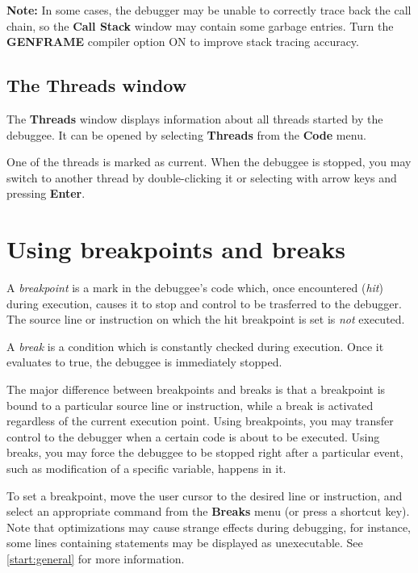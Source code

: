{\bf Note:} In some cases, the debugger may be unable to correctly trace back the
call chain, so the {\bf Call Stack} window may contain some garbage entries.
Turn the {\bf GENFRAME} compiler option ON to improve stack tracing accuracy.

\subsection{The Threads window}
\label{dialog:executing:threads}

The {\bf Threads} window displays information about all threads
started by the debuggee. It can be opened by selecting {\bf Threads}
from the {\bf Code} menu.

One of the threads is marked as current. When the debuggee is stopped,
you may switch to another thread by double-clicking it or selecting
with arrow keys and pressing {\bf Enter}.


\section{Using breakpoints and breaks}
\label{dialog:breaks}

A {\it breakpoint} is a mark in the debuggee's code which, once encountered
({\it hit}) during execution, causes it to stop and control to be trasferred
to the debugger. The source line or instruction on which the hit breakpoint is set is
{\it not} executed.

A {\it break} is a condition which is constantly checked during execution.
Once it evaluates to true, the debuggee is immediately stopped.

The major difference between breakpoints and breaks is that a breakpoint is
bound to a particular source line or instruction, while a break is activated
regardless of the current execution point. Using breakpoints, you may transfer
control to the debugger when a certain code is about to be executed.
Using breaks, you may force the debuggee to be stopped right after
a particular event, such as modification of a specific variable, happens in it.

To set a breakpoint, move the user cursor to the desired line or instruction,
and select an appropriate command from the {\bf Breaks} menu (or press a shortcut key).
Note that optimizations may cause strange effects during debugging, for instance,
some lines containing statements may be displayed as unexecutable.
See \ref{start:general} for more information.

